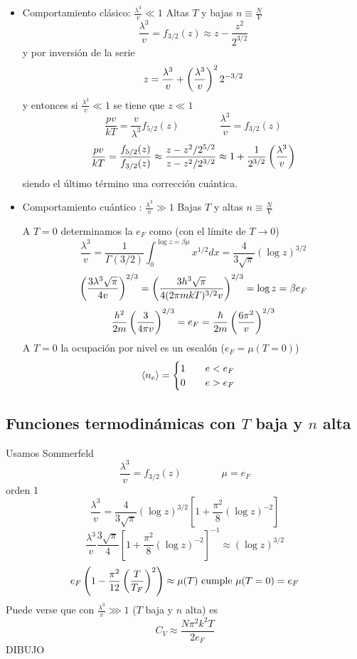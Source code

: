 \documentclass[10pt,oneside]{CBFT_book}
\begin{document}
\begin{itemize}
 \item Comportamiento clásico: $\frac{\lambda^3}{v} \ll 1$ Altas $T$ y bajas $n\equiv \frac{N}{V}$ 
 \[
	\frac{\lambda^3}{v} = f_{3/2}(z) \approx z - \frac{z^2}{2^{3/2}}
 \]
 y por inversión de la serie 
 \[
	z = \frac{\lambda^3}{v} + \left( \frac{ \lambda^3 }{ v } \right)^2 2^{-3/2}
 \]
 y entonces si $\frac{\lambda^3}{v} \ll 1$ se tiene que $ z \ll 1 $
 \[
	\frac{pv}{kT} = \frac{v}{\lambda^3} f_{5/2}(z) \qquad \qquad \frac{\lambda^3}{v} = f_{3/2}(z)
 \]
 \[
	\frac{pv}{kT} = \frac{f_{5/2}(z)}{f_{3/2}(z)} \approx \frac{z - z^2/2^{5/2}}{z - z^2/2^{3/2}}
	\approx 1 + \frac{1}{2^{3/2}} \left( \frac{ \lambda^3 }{ v } \right)
 \]
 siendo el último término una corrección cuántica.
 
  \item Comportamiento cuántico : $\frac{\lambda^3}{v} \gg 1$ Bajas $T$ y altas $n\equiv \frac{N}{V}$ 
  
  A $ T = 0 $ determinamos la $ e_F $ como (con el límite de $T\to 0$)
  \[
	\frac{\lambda^3}{v} = \frac{1}{\Gamma(3/2)} \int_0^{\log z = \beta\mu} x^{1/2} dx = 
	 \frac{4}{ 3 \sqrt{\pi} } (\log z )^{3/2}
  \]
  \[
	\left( \frac{  3  \lambda^3  \sqrt{\pi}  }{ 4v } \right)^{2/3} = \left( \frac{  3  h^3  \sqrt{\pi}  }{ 4(2\pi m k T)^{3/2}v } \right)^{2/3} 
	= \log z =  \beta e_F
  \]
  \[
	\frac{h^2}{2m}\left( \frac{ 3 }{ 4\pi v } \right)^{2/3} = e_F = \frac{\hbar}{2m}\left( \frac{ 6\pi^2 }{ v } \right)^{2/3}
  \]
  A $ T = 0 $ la ocupación por nivel es un escalón ($e_F = \mu(T=0) $) 
  \[
	\braket{n_e} = 	\begin{cases}
			1 \qquad e < e_F \\
			0 \qquad e > e_F
			\end{cases}
  \]
\end{itemize}

\subsection{Funciones termodinámicas con $T$ baja y $n$ alta}

Usamos Sommerfeld
\[
	\frac{\lambda^3}{v} = f_{3/2}(z) \qquad  \qquad \mu = e_F
\]
orden 1
\[
	\frac{\lambda^3}{v} =  
	\frac{4}{3\sqrt{\pi} } (\log z )^{3/2} \left[ 1 + \frac{\pi^2}{8}(\log z )^{-2} \right] 
\]
\[
	\frac{\lambda^3}{v} \frac{3\sqrt{\pi} }{4} \left[ 1 + \frac{\pi^2}{8}(\log z )^{-2} \right]^{-1} 
	\approx (\log z)^{3/2} 
\]
\[
	e_F \left( 1- \frac{\pi^2}{12}\left( \frac{ T }{ T_F } \right)^2 \right) \approx \mu( T ) \text{ cumple $\mu(T=0)=e_F$}
\]
Puede verse que con $ \frac{\lambda^3}{v} \ggg 1 $ ($T$ baja y $n$ alta) es
\[
	C_V \approx \frac{N \pi^2 k^2 T}{2 e_F}
\]
DIBUJO
\end{document}
